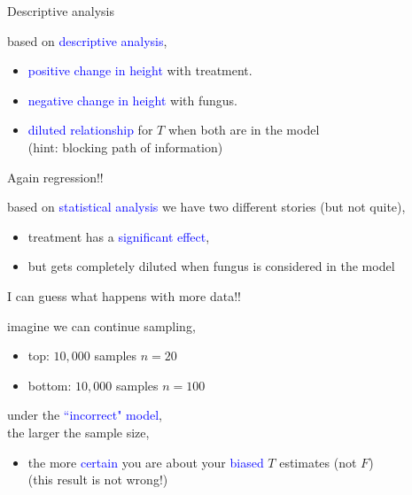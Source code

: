 %
%
\begin{lhframe}[rhgraphic={\texttt{[image: pipe2\_stat.png]}}]
	{Descriptive analysis}
	
	based on \textcolor{blue}{descriptive analysis},
	\begin{itemize}
		\item \textcolor{blue}{positive change in height} with treatment.
		\item \textcolor{blue}{negative change in height} with fungus.
		\item \textcolor{blue}{diluted relationship} for $T$ when both are in the model \\
		{\small (hint: blocking path of information)}
	\end{itemize}
\end{lhframe}
%
%
\begin{lhframe}[rhgraphic={\texttt{[image: pipe2\_reg.png]}}]
	{Again regression!!}
	
	based on \textcolor{blue}{statistical analysis} we have two different stories (but not quite),
	\begin{itemize}
		\item treatment has a \textcolor{blue}{significant effect},
		\item but gets completely diluted when fungus is considered in the model
	\end{itemize}
\end{lhframe}
%
%
\begin{lhframe}[rhgraphic={\texttt{[image: pipe2\_samplesize.pdf]}}]
	{I can guess what happens with more data!!}
	
	imagine we can continue sampling,
	\begin{itemize}
		\item top: $10,000$ samples $n=20$
		\item bottom: $10,000$ samples $n=100$
	\end{itemize}
	
	under the \textcolor{blue}{``incorrect" model}, \\
	the larger the sample size,
	\begin{itemize}
		\item the more \textcolor{blue}{certain} you are about your \textcolor{blue}{biased} $T$ estimates (not $F$)\\
		{\small (this result is not wrong!)}
	\end{itemize}
\end{lhframe}
